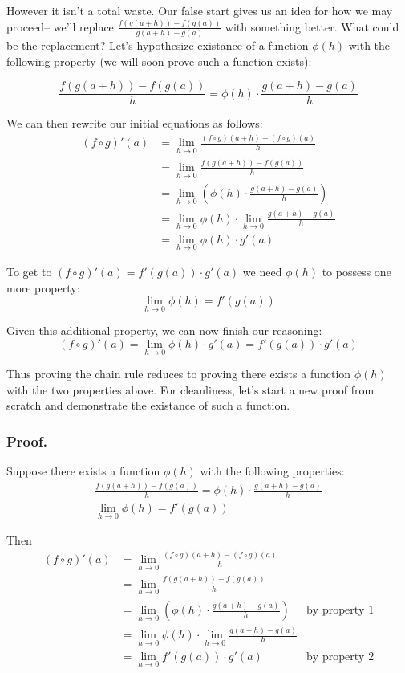 However it isn't a total waste. Our false start gives us an idea for
how we may proceed-- we'll replace
$\frac{f(g(a+h))-f(g(a))}{g(a+h)-g(a)}$ with something
better. What could be the replacement? Let's hypothesize existance of
a function $\phi(h)$ with the following property (we will soon prove such
a function exists):

\[\frac{f(g(a+h))-f(g(a))}{h}=\phi(h)\cdot\frac{g(a+h)-g(a)}{h}\]

We can then rewrite our initial equations as follows:
\begin{align*}
  (f\circ g)'(a)&=\lim_{h\to0}\frac{(f\circ g)(a+h)-(f\circ g)(a)}{h}\\
            &=\lim_{h\to0}\frac{f(g(a+h))-f(g(a))}{h}\\
            &=\lim_{h\to0}\left(\phi(h)\cdot\frac{g(a+h)-g(a)}{h}\right)\\
            &=\lim_{h\to0}\phi(h)\cdot\lim_{h\to0}\frac{g(a+h)-g(a)}{h}\\
            &=\lim_{h\to0}\phi(h)\cdot g'(a)
\end{align*}

To get to $(f\circ g)'(a)=f'(g(a))\cdot g'(a)$ we need $\phi(h)$ to possess one
more property:
\[\lim_{h\to0}\phi(h)=f'(g(a))\]

Given this additional property, we can now finish our reasoning:
\[(f\circ g)'(a)=\lim_{h\to0}\phi(h)\cdot g'(a)=f'(g(a))\cdot g'(a)\]

Thus proving the chain rule reduces to proving there exists a function
$\phi(h)$ with the two properties above. For cleanliness, let's start a
new proof from scratch and demonstrate the existance of such a
function.

\subsubsection*{Proof.}

Suppose there exists a function $\phi(h)$ with the
following properties:
\setcounter{equation}{0}
\begin{gather}
\frac{f(g(a+h))-f(g(a))}{h}=\phi(h)\cdot\frac{g(a+h)-g(a)}{h}\\
\lim_{h\to0}\phi(h)=f'(g(a))
\end{gather}

Then
\begin{align*}
  (f\circ g)'(a)&=\lim_{h\to0}\frac{(f\circ g)(a+h)-(f\circ g)(a)}{h}\\
            &=\lim_{h\to0}\frac{f(g(a+h))-f(g(a))}{h}\\
            &=\lim_{h\to0}\left(\phi(h)\cdot\frac{g(a+h)-g(a)}{h}\right)&\text{by
                                                                 property
                                                                 1}\\
            &=\lim_{h\to0}\phi(h)\cdot\lim_{h\to0}\frac{g(a+h)-g(a)}{h}\\
            &=\lim_{h\to0}f'(g(a))\cdot g'(a)&\text{by property 2}
\end{align*}

